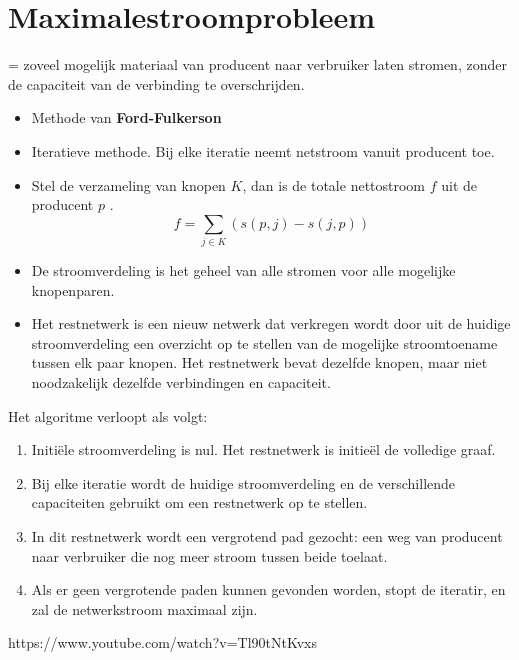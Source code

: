 \documentclass{report}
\begin{document}
\section{Maximalestroomprobleem}
= zoveel mogelijk materiaal van producent naar verbruiker laten stromen, zonder de capaciteit van de verbinding te overschrijden.
\begin{itemize}
	\item Methode van \textbf{Ford-Fulkerson} 
	\item Iteratieve methode. Bij elke iteratie neemt netstroom vanuit producent toe.
	\item Stel de verzameling van knopen $K$, dan is de totale nettostroom $f$ uit de producent $p$ . 
		$$f = \sum_{j \in K} (s(p, j) - s(j, p))$$
	\item De stroomverdeling is het geheel van alle stromen voor alle mogelijke knopenparen. 
	\item Het restnetwerk is een nieuw netwerk dat verkregen wordt door uit de huidige stroomverdeling een overzicht op te stellen van de mogelijke stroomtoename tussen elk paar knopen. Het restnetwerk bevat dezelfde knopen, maar niet noodzakelijk dezelfde verbindingen en capaciteit.
\end{itemize}
Het algoritme verloopt als volgt:
\begin{enumerate}
	\item Initiële stroomverdeling is nul. Het restnetwerk is initieël de volledige graaf.
	\item Bij elke iteratie wordt de huidige stroomverdeling en de verschillende capaciteiten gebruikt om een restnetwerk op te stellen.
	\item In dit restnetwerk wordt een vergrotend pad gezocht: een weg van producent naar verbruiker die nog meer stroom tussen beide toelaat.
	\item Als er geen vergrotende paden kunnen gevonden worden, stopt de iteratir, en zal de netwerkstroom maximaal zijn.
\end{enumerate}
https://www.youtube.com/watch?v=Tl90tNtKvxs
\end{document}
